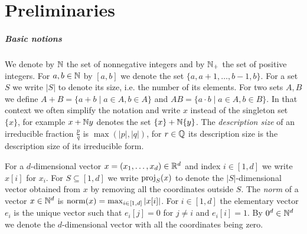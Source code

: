 \section{Preliminaries}\label{sec:prelim}

\subparagraph*{Basic notions}
We denote by $\mathbb{N}$ the set of nonnegative integers and by $\mathbb{N}_{+}$ the set of positive integers.
For $a, b \in \mathbb{N}$ by $[a, b]$ we denote the set $\{a, a+1, \ldots, b-1, b\}$.
For a set $S$ we write $|S|$ to denote its size, i.e. the number of its elements.
For two sets $A, B$ we define $A + B = \{a+b \mid a \in A, b \in A\}$ and $AB = \{a \cdot b \mid a \in A, b \in B\}$.
In that context we often simplify the notation and write $x$ instead of the singleton set $\{x\}$,
for example $x + \mathbb{N} y$ denotes the set $\{x\} + \mathbb{N} \{y\}$.
The \emph{description size} of an irreducible fraction $\frac{p}{q}$ is $\max(|p|, |q|)$, for $r \in \mathbb{Q}$
its description size is the description size of its irreducible form.

For a $d$-dimensional vector $x = (x_1, \ldots, x_d) \in \mathbb{R}^d$ and index $i \in [1,d]$ we write $x[i]$ for $x_i$.
For $S \subseteq [1,d]$ we write $\textup{proj}_S(x)$ to denote the $|S|$-dimensional vector
obtained from $x$ by removing all the coordinates outside $S$.
The \emph{norm} of a vector $x \in \mathbb{N}^d$ is $\textup{norm}(x) = \max_{i \in [1,d]} |x[i]|$.
For $i \in [1,d]$ the elementary vector $e_i$
is the unique vector such that $e_i[j] = 0$ for $j \neq i$ and $e_i[i] = 1$.
By $0^d \in \mathbb{N}^d$ we denote the $d$-dimensional vector with all the coordinates being zero.

